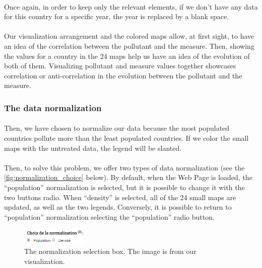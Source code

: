 \documentclass[preprint,journal]{vgtc}       %
\begin{document}
\paragraph{}
Once again, in order to keep only the relevant elements, if we don’t have any data for this country for a specific year, the year is replaced by a blank space.
\paragraph{}
Our visualization arrangement and the colored maps allow, at first sight, to have an idea of the correlation between the pollutant and the measure. Then, showing the values for a country in the 24 maps help us have an idea of the evolution of both of them. Visualizing pollutant and measure values together showcases correlation or anti-correlation in the evolution between the pollutant and the measure.

\subsubsection{The data normalization}
\paragraph{}
Then, we have chosen to normalize our data because the most populated countries pollute more than the least populated countries. If we color the small maps with the untreated data, the legend will be slanted. 
\paragraph{}
Then, to solve this problem, we offer two types of data normalization (see the \autoref{fig:normalization_choice} below). By default, when the Web Page is loaded, the “population” normalization is selected, but it is possible to change it with the two buttons radio. When “density” is selected, all of the 24 small maps are updated, as well as the two legends. Conversely, it is possible to return to “population” normalization selecting the “population” radio button. 

\begin{figure}[H]
 \centering %
 \includegraphics[width=120px]{choice2}
 \caption{The normalization selection box. The image is from our visualization.}
 \label{fig:normalization_choice}
\end{figure}
\end{document}

